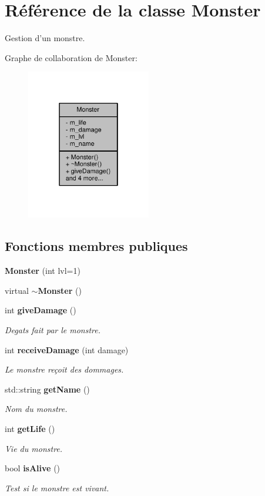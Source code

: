 \section{Référence de la classe Monster}
\label{class_monster}


Gestion d'un monstre.  




Graphe de collaboration de Monster\-:\nopagebreak
\begin{figure}[H]
\begin{center}
\leavevmode
\includegraphics[width=154pt]{class_monster__coll__graph}
\end{center}
\end{figure}
\subsection*{Fonctions membres publiques}
\begin{DoxyCompactItemize}
\item 
{\bf Monster} (int lvl=1)
\item 
virtual {\bf $\sim$\-Monster} ()
\item 
int {\bf give\-Damage} ()
\begin{DoxyCompactList}\small\item\em Degats fait par le monstre. \end{DoxyCompactList}\item 
int {\bf receive\-Damage} (int damage)
\begin{DoxyCompactList}\small\item\em Le monstre reçoit des dommages. \end{DoxyCompactList}\item 
std\-::string {\bf get\-Name} ()
\begin{DoxyCompactList}\small\item\em Nom du monstre. \end{DoxyCompactList}\item 
int {\bf get\-Life} ()
\begin{DoxyCompactList}\small\item\em Vie du monstre. \end{DoxyCompactList}\item 
bool {\bf is\-Alive} ()
\begin{DoxyCompactList}\small\item\em Test si le monstre est vivant. \end{DoxyCompactList}\end{DoxyCompactItemize}
